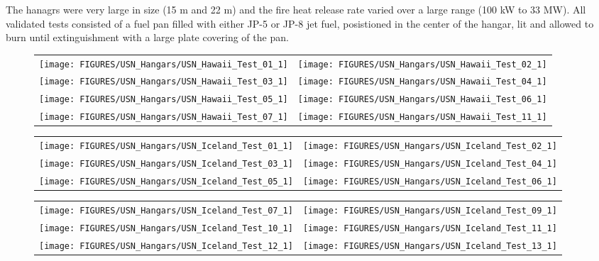 The hanagrs were very large in size (15 m and 22 m) and the fire heat release rate varied over a large range (100 kW to 33 MW). All validated tests consisted of a fuel pan filled with either JP-5 or JP-8 jet fuel, posistioned in the center of the hangar, lit and allowed to burn until extinguishment with a large plate covering of the pan.

\newpage

\begin{figure}[p]
\begin{tabular*}{\textwidth}{l@{\extracolsep{\fill}}r}
\texttt{[image: FIGURES/USN\_Hangars/USN\_Hawaii\_Test\_01\_1]} &
\texttt{[image: FIGURES/USN\_Hangars/USN\_Hawaii\_Test\_02\_1]} \\
\texttt{[image: FIGURES/USN\_Hangars/USN\_Hawaii\_Test\_03\_1]} &
\texttt{[image: FIGURES/USN\_Hangars/USN\_Hawaii\_Test\_04\_1]} \\
\texttt{[image: FIGURES/USN\_Hangars/USN\_Hawaii\_Test\_05\_1]} &
\texttt{[image: FIGURES/USN\_Hangars/USN\_Hawaii\_Test\_06\_1]} \\
\texttt{[image: FIGURES/USN\_Hangars/USN\_Hawaii\_Test\_07\_1]} &
\texttt{[image: FIGURES/USN\_Hangars/USN\_Hawaii\_Test\_11\_1]}
\end{tabular*}
\label{USN_Plume_Hawaii}
\end{figure}

\begin{figure}[p]
\begin{tabular*}{\textwidth}{l@{\extracolsep{\fill}}r}
\texttt{[image: FIGURES/USN\_Hangars/USN\_Iceland\_Test\_01\_1]} &
\texttt{[image: FIGURES/USN\_Hangars/USN\_Iceland\_Test\_02\_1]} \\
\texttt{[image: FIGURES/USN\_Hangars/USN\_Iceland\_Test\_03\_1]} &
\texttt{[image: FIGURES/USN\_Hangars/USN\_Iceland\_Test\_04\_1]} \\
\texttt{[image: FIGURES/USN\_Hangars/USN\_Iceland\_Test\_05\_1]} &
\texttt{[image: FIGURES/USN\_Hangars/USN\_Iceland\_Test\_06\_1]} \\
\end{tabular*}
\label{USN_Plume_Iceland_1}
\end{figure}

\begin{figure}[p]
\begin{tabular*}{\textwidth}{l@{\extracolsep{\fill}}r}
\texttt{[image: FIGURES/USN\_Hangars/USN\_Iceland\_Test\_07\_1]} &
\texttt{[image: FIGURES/USN\_Hangars/USN\_Iceland\_Test\_09\_1]} \\
\texttt{[image: FIGURES/USN\_Hangars/USN\_Iceland\_Test\_10\_1]} &
\texttt{[image: FIGURES/USN\_Hangars/USN\_Iceland\_Test\_11\_1]} \\
\texttt{[image: FIGURES/USN\_Hangars/USN\_Iceland\_Test\_12\_1]} &
\texttt{[image: FIGURES/USN\_Hangars/USN\_Iceland\_Test\_13\_1]} \\
\end{tabular*}
\label{USN_Plume_Iceland_2}
\end{figure}

